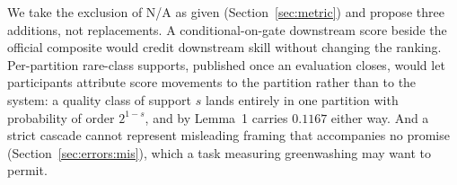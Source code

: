 We take the exclusion of N/A as given (Section~\ref{sec:metric}) and propose three additions, not
replacements. A conditional-on-gate downstream score beside the official composite would credit
downstream skill without changing the ranking. Per-partition rare-class supports, published once
an evaluation closes, would let participants attribute score movements to the partition rather
than to the system: a quality class of support $s$ lands entirely in one partition with
probability of order $2^{1-s}$, and by Lemma~1 carries $0.1167$ either way. And a strict cascade cannot represent
misleading framing that accompanies no promise (Section~\ref{sec:errors:mis}), which a task
measuring greenwashing may want to permit.
